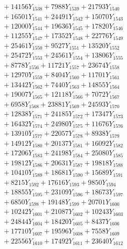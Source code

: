 \documentclass[a4paper,10pt]{article}
\begin{document}
{\begin{align}
&\;  + 14156 Y_{1538} + 7988 Y_{1539} + 21793 Y_{1540} \\[0.3ex]
&\;  + 16501 Y_{1541} + 24491 Y_{1542} + 15070 Y_{1543} \\[0.3ex]
&\;  + 12000 Y_{1544} + 19636 Y_{1545} + 17820 Y_{1546} \\[0.3ex]
&\;  + 11255 Y_{1547} + 17352 Y_{1548} + 22776 Y_{1549} \\[0.3ex]
&\;  + 25461 Y_{1550} + 9527 Y_{1551} + 13520 Y_{1552} \\[0.3ex]
&\;  + 25472 Y_{1553} + 24561 Y_{1554} + 13806 Y_{1555} \\[0.3ex]
&\;  + 8778 Y_{1556} + 11721 Y_{1557} + 23674 Y_{1558} \\[0.5ex]\allowbreak
&\;  + 12970 Y_{1559} + 8404 Y_{1560} + 11701 Y_{1561} \\[0.3ex]
&\;  + 13442 Y_{1562} + 7440 Y_{1563} + 14855 Y_{1564} \\[0.3ex]
&\;  + 19007 Y_{1565} + 12118 Y_{1566} + 7072 Y_{1567} \\[0.3ex]
&\;  + 6958 Y_{1568} + 23881 Y_{1569} + 24593 Y_{1570} \\[0.3ex]
&\;  + 12838 Y_{1571} + 24185 Y_{1572} + 17347 Y_{1573} \\[0.3ex]
&\;  + 16432 Y_{1574} + 24980 Y_{1575} + 11676 Y_{1576} \\[0.3ex]
&\;  + 13910 Y_{1577} + 22057 Y_{1578} + 8938 Y_{1579} \\[0.3ex]
&\;  + 14912 Y_{1580} + 20137 Y_{1581} + 16092 Y_{1582} \\[0.3ex]
&\;  + 17206 Y_{1583} + 24198 Y_{1584} + 25080 Y_{1585} \\[0.3ex]
&\;  + 19812 Y_{1586} + 20631 Y_{1587} + 19818 Y_{1588} \\[0.5ex]\allowbreak
&\;  + 10410 Y_{1589} + 18681 Y_{1590} + 15689 Y_{1591} \\[0.3ex]
&\;  + 8215 Y_{1592} + 17616 Y_{1593} + 9850 Y_{1594} \\[0.3ex]
&\;  + 18855 Y_{1595} + 23109 Y_{1596} + 18673 Y_{1597} \\[0.3ex]
&\;  + 6850 Y_{1598} + 19148 Y_{1599} + 20701 Y_{1600} \\[0.3ex]
&\;  + 10242 Y_{1601} + 21087 Y_{1602} + 10243 Y_{1603} \\[0.3ex]
&\;  + 24844 Y_{1604} + 18420 Y_{1605} + 8437 Y_{1606} \\[0.3ex]
&\;  + 17710 Y_{1607} + 19596 Y_{1608} + 7558 Y_{1609} \\[0.3ex]
&\;  + 22556 Y_{1610} + 17492 Y_{1611} + 23640 Y_{1612} \\[0.3ex]

\end{align}}
\end{document}
